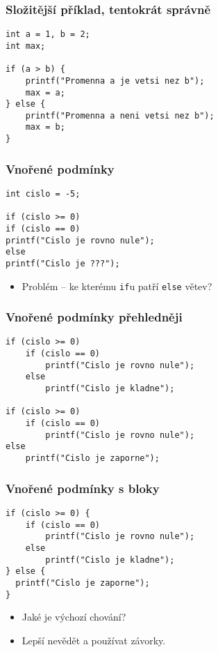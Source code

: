 \documentclass{beamer}
\newenvironment{itemizex}%
  {\large \begin{itemize}%
    \setlength{\itemsep}{8pt}%
    \setlength{\parskip}{8pt}}%
  {\end{itemize}}
\begin{document}
\begin{frame}[t,fragile]\frametitle{Složitější příklad, tentokrát správně} 
  \begin{verbatim} 
int a = 1, b = 2;
int max;

if (a > b) {
    printf("Promenna a je vetsi nez b");
    max = a;
} else {
    printf("Promenna a neni vetsi nez b");
    max = b;
}
  \end{verbatim}
\end{frame}


\begin{frame}[t,fragile]\frametitle{Vnořené podmínky} 
  \begin{verbatim} 
int cislo = -5;

if (cislo >= 0)
if (cislo == 0)
printf("Cislo je rovno nule");
else
printf("Cislo je ???");
  \end{verbatim}

  \begin{itemizex}
    \item Problém -- ke kterému \texttt{if}u patří \texttt{else} větev?
  \end{itemizex}
\end{frame}


\begin{frame}[t,fragile]\frametitle{Vnořené podmínky přehledněji} 
\begin{verbatim} 
if (cislo >= 0)
    if (cislo == 0)
        printf("Cislo je rovno nule");
    else
        printf("Cislo je kladne");

if (cislo >= 0)
    if (cislo == 0)
        printf("Cislo je rovno nule");
else
    printf("Cislo je zaporne");
\end{verbatim}
\end{frame}


\begin{frame}[t,fragile]\frametitle{Vnořené podmínky s bloky} 
  \begin{verbatim} 
if (cislo >= 0) {
    if (cislo == 0)
        printf("Cislo je rovno nule");
    else 
        printf("Cislo je kladne");
} else {
  printf("Cislo je zaporne");
}
  \end{verbatim}

  \begin{itemizex}
    \item Jaké je výchozí chování?
    \item Lepší nevědět a používat závorky.
  \end{itemizex}
\end{frame}
\end{document}
